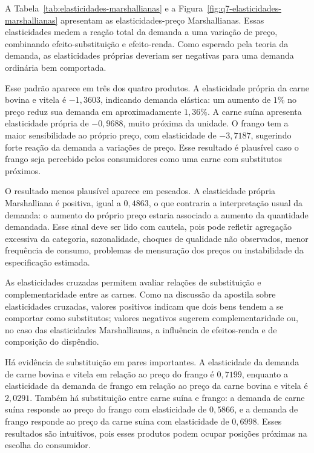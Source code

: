 

A Tabela~\ref{tab:elasticidades-marshallianas} e a Figura~\ref{fig:q7-elasticidades-marshallianas} apresentam as elasticidades-preço Marshallianas. Essas elasticidades medem a reação total da demanda a uma variação de preço, combinando efeito-substituição e efeito-renda. Como esperado pela teoria da demanda, as elasticidades próprias deveriam ser negativas para uma demanda ordinária bem comportada.

Esse padrão aparece em três dos quatro produtos. A elasticidade própria da carne bovina e vitela é \(-1{,}3603\), indicando demanda elástica: um aumento de \(1\%\) no preço reduz sua demanda em aproximadamente \(1{,}36\%\). A carne suína apresenta elasticidade própria de \(-0{,}9688\), muito próxima da unidade. O frango tem a maior sensibilidade ao próprio preço, com elasticidade de \(-3{,}7187\), sugerindo forte reação da demanda a variações de preço. Esse resultado é plausível caso o frango seja percebido pelos consumidores como uma carne com substitutos próximos.

O resultado menos plausível aparece em pescados. A elasticidade própria Marshalliana é positiva, igual a \(0{,}4863\), o que contraria a interpretação usual da demanda: o aumento do próprio preço estaria associado a aumento da quantidade demandada. Esse sinal deve ser lido com cautela, pois pode refletir agregação excessiva da categoria, sazonalidade, choques de qualidade não observados, menor frequência de consumo, problemas de mensuração dos preços ou instabilidade da especificação estimada.

As elasticidades cruzadas permitem avaliar relações de substituição e complementaridade entre as carnes. Como na discussão da apostila sobre elasticidades cruzadas, valores positivos indicam que dois bens tendem a se comportar como substitutos; valores negativos sugerem complementaridade ou, no caso das elasticidades Marshallianas, a influência de efeitos-renda e de composição do dispêndio.

Há evidência de substituição em pares importantes. A elasticidade da demanda de carne bovina e vitela em relação ao preço do frango é \(0{,}7199\), enquanto a elasticidade da demanda de frango em relação ao preço da carne bovina e vitela é \(2{,}0291\). Também há substituição entre carne suína e frango: a demanda de carne suína responde ao preço do frango com elasticidade de \(0{,}5866\), e a demanda de frango responde ao preço da carne suína com elasticidade de \(0{,}6998\). Esses resultados são intuitivos, pois esses produtos podem ocupar posições próximas na escolha do consumidor.

